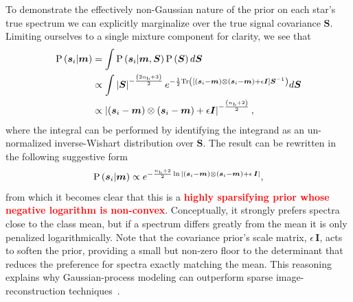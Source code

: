 \documentclass[a4paper,fleqn,usenatbib]{mnras}
\newcommand{\nb}{n_{\rm b}}
\newcommand{\prob}{{\rm P}}
\newcommand{\specmean}{{\bm m}}
\newcommand{\speccov}{{\bm S}}
\newcommand{\objspec}{{\bm s}}
\newcommand{\identity}{{\bm I}}
\newcommand\edit[1]{\textcolor{red}{\textbf{#1}}}
\begin{document}
To demonstrate the effectively non-Gaussian nature of the prior on each star's true spectrum we can explicitly marginalize over the true signal covariance $\speccov$. Limiting ourselves to a single mixture component for clarity, we see that
\begin{align}
\prob\left(\objspec_i|\specmean\right) & = 
\int
	\prob\left(\objspec_i|\specmean,\speccov\right)
	\prob\left(\speccov\right)
d\speccov \nonumber \\
& \propto \int
	\left| \speccov \right|^{-\frac{\left( 2\nb+3 \right)}{2}}
	e^{-\frac{1}{2} {\rm Tr}\left( \left[ \left(\objspec_i-\specmean \right) \otimes \left(\objspec_i-\specmean \right) + \epsilon \identity \right]  \speccov^{-1} \right)}
d\speccov \nonumber \\
& \propto \left| \left(\objspec_i-\specmean \right) \otimes \left(\objspec_i-\specmean \right) + \epsilon \identity \right|^{-\frac{\left( \nb+2 \right)}{2}},
\end{align}
where the integral can be performed by identifying the integrand as an un-normalized inverse-Wishart distribution over $\speccov$. The result can be rewritten in the following suggestive form
\begin{equation}
\prob\left(\objspec_i|\specmean\right) \propto 
e^{-\frac{\nb + 2}{2} \ln{ \left| \left(\objspec_i-\specmean \right) \otimes \left(\objspec_i-\specmean \right) + \epsilon \, \identity \right|}},
\end{equation}
from which it becomes clear that this is a \edit{highly sparsifying prior whose negative logarithm is non-convex}. Conceptually, it strongly prefers spectra close to the class mean, but if a spectrum differs greatly from the mean it is only penalized logarithmically. Note that the covariance prior's scale matrix, $\epsilon \, \identity$, acts to soften the prior, providing a small but non-zero floor to the determinant that reduces the preference for spectra exactly matching the mean. This reasoning explains why Gaussian-process modeling can outperform sparse image-reconstruction techniques~\citep{Sutter_etal:2014}.
\end{document}
